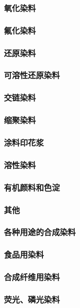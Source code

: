 \documentclass[UTF8]{../../ApplicationUniverse}
\begin{document}
    \subsubsection{氧化染料}
    \subsubsection{氟化染料}
    \subsubsection{还原染料}
    \subsubsection{可溶性还原染料}
    \subsubsection{交链染料}
    \subsubsection{缩聚染料}
    \subsubsection{涂料印花浆}
    \subsubsection{溶性染料}
    \subsubsection{有机颜料和色淀}
    \subsubsection{其他}
\subsubsection{各种用途的合成染料}
    \subsubsection{食品用染料}
    \subsubsection{合成纤维用染料}
    \subsubsection{荧光、磷光染料}
\end{document}
